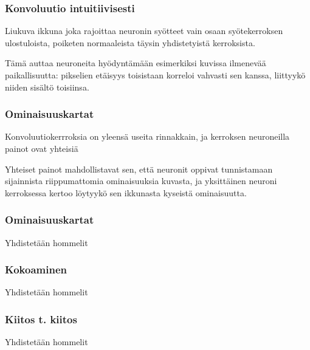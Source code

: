 \documentclass{beamer}
\begin{document}
\begin{frame}
    \frametitle{Konvoluutio intuitiivisesti}
    Liukuva ikkuna joka rajoittaa neuronin syötteet vain osaan syötekerroksen ulostuloista, poiketen
    normaaleista täysin yhdistetyistä kerroksista.

    Tämä auttaa neuroneita hyödyntämään esimerkiksi kuvissa ilmenevää paikallisuutta:
    pikselien etäisyys toisistaan korreloi vahvasti sen kanssa, liittyykö niiden sisältö toisiinsa.
\end{frame}


\begin{frame}
    \frametitle{Ominaisuuskartat}
    Konvoluutiokerrroksia on yleensä useita rinnakkain, ja kerroksen neuroneilla painot ovat yhteisiä

    Yhteiset painot mahdollistavat sen, että neuronit oppivat tunnistamaan sijainnista riippumattomia
    ominaisuuksia kuvasta, ja yksittäinen neuroni kerroksessa kertoo löytyykö sen ikkunasta kyseistä
    ominaisuutta.
\end{frame}

\begin{frame}
    \frametitle{Ominaisuuskartat}
    Yhdistetään hommelit
\end{frame}

\begin{frame}
    \frametitle{Kokoaminen}
    Yhdistetään hommelit
\end{frame}

\begin{frame}
    \frametitle{Kiitos t. kiitos}
    Yhdistetään hommelit
\end{frame}
\end{document}
